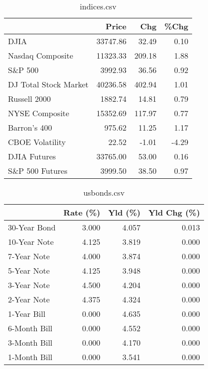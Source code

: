 \documentclass{article}%
\begin{document}
\begin{table}[htbp]%
\caption{indices.csv}%
\centering%
\begin{adjustbox}{width=1\textwidth}%
\begin{tabular}{lrrr}
\toprule
                      &    Price &    Chg &  \%Chg \\
\midrule
                 DJIA & 33747.86 &  32.49 &  0.10 \\
     Nasdaq Composite & 11323.33 & 209.18 &  1.88 \\
              S\&P 500 &  3992.93 &  36.56 &  0.92 \\
DJ Total Stock Market & 40236.58 & 402.94 &  1.01 \\
         Russell 2000 &  1882.74 &  14.81 &  0.79 \\
       NYSE Composite & 15352.69 & 117.97 &  0.77 \\
         Barron's 400 &   975.62 &  11.25 &  1.17 \\
      CBOE Volatility &    22.52 &  -1.01 & -4.29 \\
         DJIA Futures & 33765.00 &  53.00 &  0.16 \\
      S\&P 500 Futures &  3999.50 &  38.50 &  0.97 \\
\bottomrule
\end{tabular}
%
\end{adjustbox}%
\end{table}

%


\begin{table}[htbp]%
\caption{usbonds.csv}%
\centering%
\begin{adjustbox}{width=1\textwidth}%
\begin{tabular}{lrrr}
\toprule
             &  Rate (\%) &  Yld (\%) &  Yld Chg (\%) \\
\midrule
30-Year Bond &     3.000 &    4.057 &        0.013 \\
10-Year Note &     4.125 &    3.819 &        0.000 \\
 7-Year Note &     4.000 &    3.874 &        0.000 \\
 5-Year Note &     4.125 &    3.948 &        0.000 \\
 3-Year Note &     4.500 &    4.204 &        0.000 \\
 2-Year Note &     4.375 &    4.324 &        0.000 \\
 1-Year Bill &     0.000 &    4.635 &        0.000 \\
6-Month Bill &     0.000 &    4.552 &        0.000 \\
3-Month Bill &     0.000 &    4.170 &        0.000 \\
1-Month Bill &     0.000 &    3.541 &        0.000 \\
\bottomrule
\end{tabular}
%
\end{adjustbox}%
\end{table}
\end{document}
